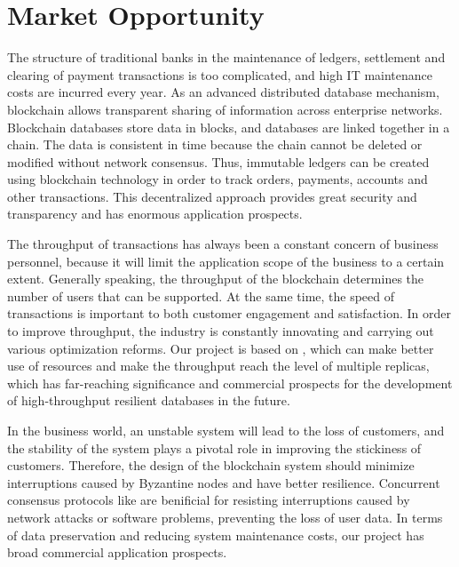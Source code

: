  \section{Market Opportunity}

 \par The structure of traditional banks in the maintenance of ledgers, settlement and clearing of payment transactions
 is too complicated, and high IT maintenance costs are incurred every year. As an advanced distributed database mechanism, 
 blockchain allows transparent sharing of information across enterprise networks. Blockchain databases store 
 data in blocks, and databases are linked together in a chain. The data is consistent in time because the chain 
 cannot be deleted or modified without network consensus. Thus, immutable ledgers can be created using 
 blockchain technology in order to track orders, payments, accounts and other transactions. This decentralized 
 approach provides great security and transparency and has enormous application prospects.

 \par The throughput of transactions has always been a constant concern of business personnel, because it will limit 
 the application scope of the business to a certain extent. Generally speaking, the throughput of the blockchain 
 determines the number of users that can be supported. At the same time, the speed of transactions is important 
 to both customer engagement and satisfaction. In order to improve throughput, the industry is constantly innovating 
 and carrying out various optimization reforms. Our project is based on \RCC{}, which can make better use of resources 
 and make the throughput reach the level of multiple replicas, which has far-reaching significance and commercial 
 prospects for the development of high-throughput resilient databases in the future.

 \par In the business world, an unstable system will lead to the loss of customers, and the stability of the system 
 plays a pivotal role in improving the stickiness of customers. Therefore, the design of the blockchain system should 
 minimize interruptions caused by Byzantine nodes and have better resilience. Concurrent consensus protocols like \RCC{} 
 are benificial for resisting interruptions caused by network attacks or software problems, preventing the loss of user data. 
 In terms of data preservation and reducing system maintenance costs, our project has broad commercial application 
 prospects.
